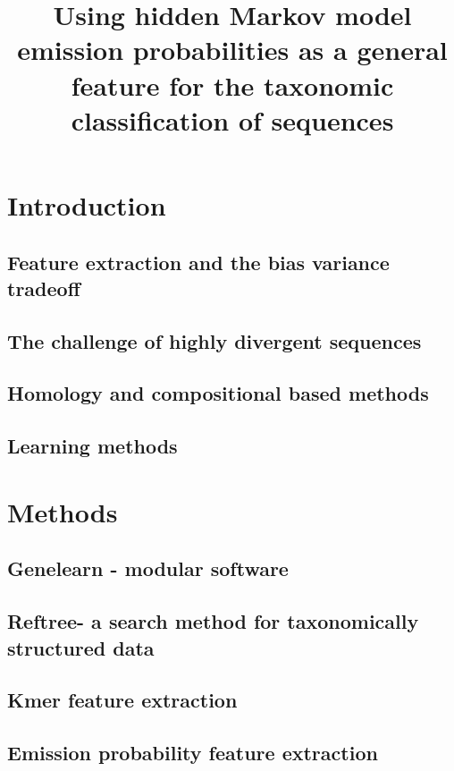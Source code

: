 \documentclass{article}
\begin{document}
\title{Using hidden Markov model emission probabilities as a general feature for the taxonomic classification of sequences}


\maketitle



\section{Introduction}

\subsection{Feature extraction and the bias variance tradeoff}
\subsection{The challenge of highly divergent sequences}
\subsection{Homology and compositional based methods}
\subsection{Learning methods}

\section{Methods}


\subsection{Genelearn - modular software}
\subsection{Reftree- a search method for taxonomically structured data}
\subsection{Kmer feature extraction}
\subsection{Emission probability feature extraction}
\end{document}
